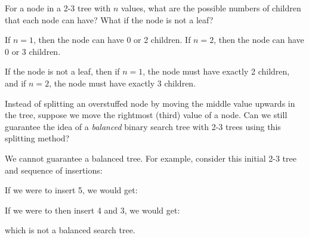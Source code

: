 
\begin{parts}
\item For a node in a 2-3 tree with $n$ values, what are the possible numbers of children that each node can have? What if the node is not a leaf?

\begin{solution}[2in]
If $n = 1$, then the node can have 0 or 2 children. If $n = 2$, then the node can have 0 or 3 children. 

If the node is not a leaf, then if $n=1$, the node must have exactly 2 children, and if $n = 2$, the node must have exactly 3 children.
\end{solution}

\item Instead of splitting an overstuffed node by moving the middle value upwards in the tree, suppose we move the rightmost (third) value of a node. Can we still guarantee the idea of a \textit{balanced} binary search tree with 2-3 trees using this splitting method?

\begin{solution}[2in]
We cannot guarantee a balanced tree. For example, consider this initial 2-3 tree and sequence of insertions: 
\begin{center}
\end{center}
\quad
If we were to insert 5, we would get: 
\begin{center}
\end{center}
\quad
If we were to then insert 4 and 3, we would get:
\begin{center}
\end{center}
which is not a balanced search tree.


\end{solution}
\end{parts}
